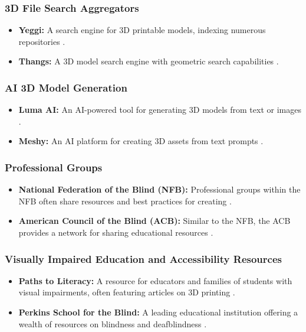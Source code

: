 \subsubsection{3D File Search Aggregators}
\begin{itemize}
	\item \textbf{Yeggi:} A search engine for 3D printable models, indexing numerous repositories \supercite{Yeggi}.
	\item \textbf{Thangs:} A 3D model search engine with geometric search capabilities \supercite{Thangs}.
\end{itemize}

\subsubsection{AI 3D Model Generation}
\begin{itemize}
	\item \textbf{Luma AI:} An AI-powered tool for generating 3D models from text or images \supercite{LumaAI}.
	\item \textbf{Meshy:} An AI platform for creating 3D assets from text prompts \supercite{Meshy}.
\end{itemize}

\subsubsection{Professional Groups}
\begin{itemize}
	\item \textbf{National Federation of the Blind (NFB):} Professional groups within the NFB often share resources and best practices for creating  \supercite{NFB}.
	\item \textbf{American Council of the Blind (ACB):} Similar to the NFB, the ACB provides a network for sharing educational resources \supercite{ACB}.
\end{itemize}

\subsubsection{Visually Impaired Education and Accessibility Resources}
\begin{itemize}
	\item \textbf{Paths to Literacy:} A resource for educators and families of students with visual impairments, often featuring articles on 3D printing \supercite{PathsToLiteracy}.
	\item \textbf{Perkins School for the Blind:} A leading educational institution offering a wealth of resources on blindness and deafblindness \supercite{Perkins}.
\end{itemize}


